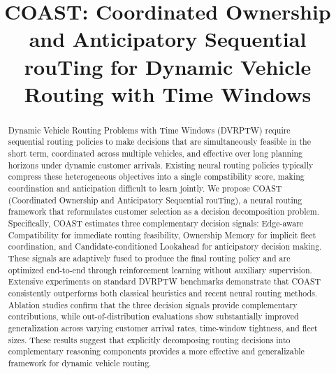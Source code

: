 \documentclass[conference]{IEEEtran}
\begin{document}
\title{COAST: Coordinated Ownership and Anticipatory Sequential rouTing for Dynamic Vehicle Routing with Time Windows}

	
\maketitle

\begin{abstract}
Dynamic Vehicle Routing Problems with Time Windows (DVRPTW) require sequential routing policies to make decisions that are simultaneously feasible in the short term, coordinated across multiple vehicles, and effective over long planning horizons under dynamic customer arrivals. Existing neural routing policies typically compress these heterogeneous objectives into a single compatibility score, making coordination and anticipation difficult to learn jointly. We propose COAST (Coordinated Ownership and Anticipatory Sequential rouTing), a neural routing framework that reformulates customer selection as a decision decomposition problem. Specifically, COAST estimates three complementary decision signals: Edge-aware Compatibility for immediate routing feasibility, Ownership Memory for implicit fleet coordination, and Candidate-conditioned Lookahead for anticipatory decision making. These signals are adaptively fused to produce the final routing policy and are optimized end-to-end through reinforcement learning without auxiliary supervision. Extensive experiments on standard DVRPTW benchmarks demonstrate that COAST consistently outperforms both classical heuristics and recent neural routing methods. Ablation studies confirm that the three decision signals provide complementary contributions, while out-of-distribution evaluations show substantially improved generalization across varying customer arrival rates, time-window tightness, and fleet sizes. These results suggest that explicitly decomposing routing decisions into complementary reasoning components provides a more effective and generalizable framework for dynamic vehicle routing.
\end{abstract}
\end{document}
